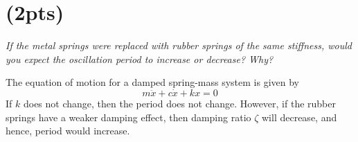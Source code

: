\section{(2pts)}
\textit{If the metal springs were replaced with rubber springs of the same stiffness, would 
you expect the oscillation period to increase or decrease? Why?}

The equation of motion for a damped spring-mass system is given by
\begin{equation*}
    m\ddot{x} + c\dot{x} + kx = 0
\end{equation*}
If $k$ does not change, then the period does not change. However, if the rubber springs have a weaker damping effect, then damping ratio $\zeta$ will decrease, and hence, period would increase.